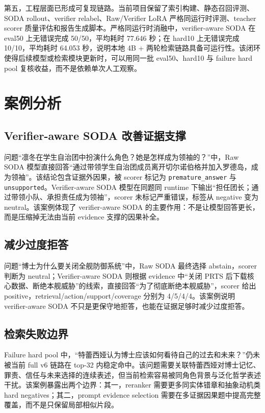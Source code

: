 \documentclass[UTF8,a4paper,12pt]{ctexart}
\newcommand{\code}[1]{\texttt{#1}}
\begin{document}
第五，工程层面已形成可复现链路。当前项目保留了索引构建、静态召回评测、SODA rollout、verifier relabel、Raw/Verifier LoRA 严格同运行时评测、teacher scorer 质量评估和报告生成脚本。严格同运行时消融中，verifier-aware SODA 在 eval50 上无错误完成 50/50，平均耗时 77.646 秒；在 hard10 上无错误完成 10/10，平均耗时 64.053 秒，说明本地 4B + 两轮检索链路具备可运行性。该闭环使得后续模型或检索模块更新时，可以用同一批 eval50、hard10 与 failure hard pool 复核收益，而不是依赖单次人工观察。

\section{案例分析}

\subsection{Verifier-aware SODA 改善证据支撑}

问题“凛冬在学生自治团中扮演什么角色？她是怎样成为领袖的？”中，Raw SODA 模型直接回答“通过带领学生自治团成员离开切尔诺伯格并加入罗德岛，成为领袖”。该结论包含证据外因果，被 scorer 标记为 \code{premature\_answer} 与 \code{unsupported}。Verifier-aware SODA 模型在同题同 runtime 下输出“担任团长；通过带领小队、承担责任成为领袖”，scorer 未标记严重错误，标签从 negative 变为 neutral。该案例体现了 verifier-aware SODA 的主要作用：不是让模型回答更长，而是压缩掉无法由当前 evidence 支撑的因果补全。

\subsection{减少过度拒答}

问题“博士为什么要关闭全舰防御系统”中，Raw SODA 最终选择 abstain，scorer 判断为 neutral；Verifier-aware SODA 则根据 evidence 中“关闭 PRTS 后下载核心数据、断绝本舰威胁”的线索，直接回答“为了彻底断绝本舰威胁”，scorer 给出 positive，retrieval/action/support/coverage 分别为 4/5/4/4。该案例说明 verifier-aware SODA 不只是更保守地拒答，也能在证据足够时减少过度拒答。

\subsection{检索失败边界}

Failure hard pool 中，“特蕾西娅认为博士应该如何看待自己的过去和未来？”仍未被当前 full v6 链路在 top-32 内稳定命中。该问题需要关联特蕾西娅对博士记忆、罪责、信任与未来选择的连续表述，但当前检索容易被同角色背景与泛化哲学表述干扰。该案例暴露出两个边界：其一，reranker 需要更多同实体错章和抽象动机类 hard negatives；其二，prompt evidence selection 需要在多证据因果题中提高完整覆盖，而不是只保留局部相似片段。
\end{document}
